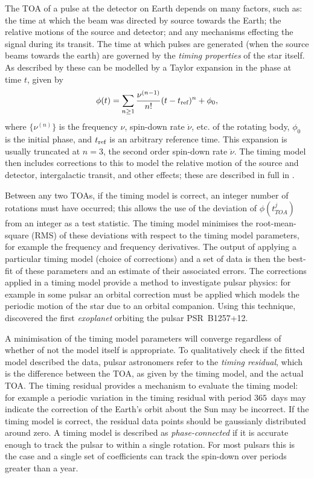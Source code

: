 The TOA of a pulse at the detector on Earth depends on many factors, such as: the
time at which the beam was directed by source towards the Earth; the relative
motions of the source and detector; and any mechanisms effecting the signal during
its transit. The time at which pulses are generated (when the source beams towards
the earth) are governed by the \emph{timing properties} of the star itself.
As described by \citet{Edwards2006} these can be modelled by a Taylor expansion
in the phase at time $t$, given by
\begin{equation}
\phi(t) = \sum_{n\ge 1}\frac{\nu^{(n-1)}}{n!}(t - t_{\textrm{ref}})^{n} + \phi_{0},
\label{eqn: Taylor compact}
\end{equation} 
where $\{\nu^{(n)}\}$ is the frequency $\nu$, spin-down rate $\dot{\nu}$, etc.
of the rotating body, $\phi_0$ is the initial phase, and $t_{\textrm{ref}}$ is an
arbitrary reference time. This expansion is usually truncated at $n=3$, the
second order spin-down rate $\ddot{\nu}$. The timing model then includes
corrections to this to model the relative motion of the source and detector,
intergalactic transit, and other effects; these are described in full in
\citet{Edwards2006}. 

Between any two TOAs, if the timing model is correct, an integer number of
rotations must have occurred; this allows the use of the deviation of
$\phi(t_{TOA}^{j})$ from an integer as a test statistic. The timing model
minimises the root-mean-square (RMS) of these deviations with respect to the timing model
parameters, for example the frequency and frequency derivatives. The output of
applying a particular timing model (choice of corrections) and a set of data is
then the best-fit of these parameters and an estimate of their associated
errors.  The corrections applied in a timing model provide a method to
investigate pulsar physics: for example in some pulsar an orbital correction
must be applied which models the periodic motion of the star due to an orbital
companion. Using this technique, \citet{wolszczan1992planetary} discovered the
first \emph{exoplanet} orbiting the pulsar PSR~B1257+12.

A minimisation of the timing model parameters will converge regardless of
whether of not the model itself is appropriate. To qualitatively check if the
fitted model described the data, pulsar astronomers refer to the \emph{timing
residual}, which is the difference between the TOA, as given by the timing
model, and the actual TOA. The timing residual provides a mechanism to evaluate
the timing model: for example a periodic variation in the timing residual with period
$365$~days may indicate the correction of the Earth's orbit about the Sun may
be incorrect. If the timing model is correct, the residual data points should
be gaussianly distributed around zero. A timing model is described as
\emph{phase-connected} if it is accurate enough to track the pulsar to within a
single rotation. For most pulsars this is the case and a single set of
coefficients can track the spin-down over periods greater than a year.

